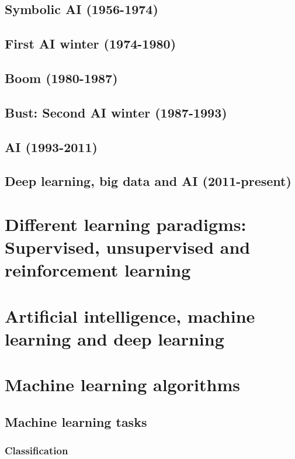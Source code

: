\subsection{Symbolic AI (1956-1974)}
\subsection{First AI winter (1974-1980)}
\subsection{Boom (1980-1987)}
\subsection{Bust: Second AI winter (1987-1993)}
\subsection{AI (1993-2011)}
\subsection{Deep learning, big data and AI (2011-present)}


%
%
%





\section{Different learning paradigms: Supervised, unsupervised and reinforcement learning}

\section{Artificial intelligence, machine learning and deep learning}

\section{Machine learning algorithms}


\subsection{Machine learning tasks}

\subsubsection{Classification}

